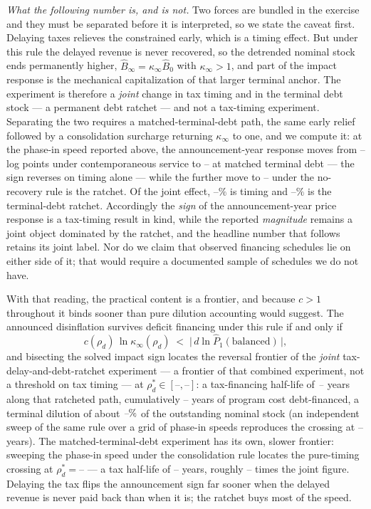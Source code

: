 \documentclass[12pt]{article}
\providecommand{\pendingnum}{\textit{--}}
\providecommand{\DefRhoStarRatchetLo}{\pendingnum}\providecommand{\DefRhoStarRatchetHi}{\pendingnum}
\providecommand{\DefCumStar}{\pendingnum}
\providecommand{\DefDecCOne}{\pendingnum}\providecommand{\DefDecCTwo}{\pendingnum}
\providecommand{\DefDecCFour}{\pendingnum}
\providecommand{\DefDecTimingShare}{\pendingnum}\providecommand{\DefDecRatchetShare}{\pendingnum}
\providecommand{\DefRhoStarTiming}{\pendingnum}\providecommand{\DefHalfStarTiming}{\pendingnum}
\providecommand{\DefTimingJointRatio}{\pendingnum}\providecommand{\DefHalfStarJointSweep}{\pendingnum}
\begin{document}
\emph{What the following number is, and is not.} Two forces are bundled in
the exercise and they must be separated before it is interpreted, so we state
the caveat first. Delaying taxes relieves the constrained early, which is a
timing effect. But under this rule the delayed revenue is never recovered, so
the detrended nominal stock ends permanently higher,
$\hat B_\infty=\kappa_\infty\hat B_0$ with $\kappa_\infty>1$, and part of
the impact response is the mechanical capitalization of that larger terminal
anchor. The experiment is therefore a \emph{joint} change in tax timing and
in the terminal debt stock --- a permanent debt ratchet --- and not a
tax-timing experiment. Separating the two requires a matched-terminal-debt
path, the same early relief followed by a consolidation surcharge returning
$\kappa_\infty$ to one, and we compute it: at the phase-in speed reported
above, the announcement-year response moves from $\DefDecCOne$ log points
under contemporaneous service to $\DefDecCTwo$ at matched terminal debt ---
the sign reverses on timing alone --- while the further move to
$\DefDecCFour$ under the no-recovery rule is the ratchet. Of the joint
effect, $\DefDecTimingShare\%$ is timing and $\DefDecRatchetShare\%$ is the
terminal-debt ratchet. Accordingly the \emph{sign} of the announcement-year
price response is a tax-timing result in kind, while the reported
\emph{magnitude} remains a joint object dominated by the ratchet, and the
headline number that follows retains its joint label. Nor do we claim that
observed financing
schedules lie on either side of it; that would require a documented sample of
schedules we do not have.

With that reading, the practical content is a frontier, and because $c>1$
throughout it binds sooner than pure dilution accounting would suggest. The
announced disinflation survives deficit financing under this rule if and only
if
\begin{equation}
c(\rho_d)\,\ln \kappa_\infty(\rho_d) \;<\;
\bigl|\,d\ln \hat P_1(\text{balanced})\,\bigr|,
\label{eq:deficitfrontier}
\end{equation}
and bisecting the solved impact sign locates the reversal frontier of the
\emph{joint} tax-delay-and-debt-ratchet experiment --- a frontier of that
combined experiment, not a threshold on tax timing --- at
$\rho_d^{*}\in[\DefRhoStarRatchetLo,\DefRhoStarRatchetHi]$: a tax-financing
half-life of $\DefHalfStarRatchet$ years along that ratcheted path,
cumulatively $\DefCumStar$ years of
program cost debt-financed, a terminal dilution of about $\DefKapStar\%$ of
the outstanding nominal stock (an independent sweep of the same rule over a
grid of phase-in speeds reproduces the crossing at
$\DefHalfStarJointSweep$ years). The matched-terminal-debt experiment has
its own, slower frontier: sweeping the phase-in speed under the
consolidation rule locates the pure-timing crossing at
$\rho_d^{*}=\DefRhoStarTiming$ ---
a tax half-life of $\DefHalfStarTiming$ years, roughly
$\DefTimingJointRatio$ times the joint figure. Delaying the tax flips the
announcement sign far sooner when the delayed revenue is never paid back
than when it is; the ratchet buys most of the speed.
\end{document}
